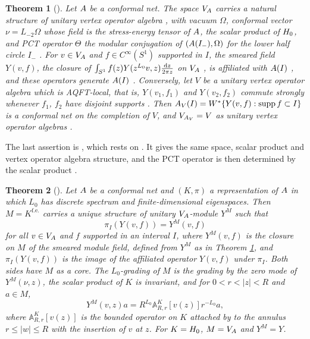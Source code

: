 \documentclass[leqno]{article}
\let\cal\relax
\newcommand{\cal}{\mathcal}
\renewcommand{\leq}{\ensuremath{\leqslant}}
\let\i\relax
\newcommand{\i}{\mathrm{i}}
\renewcommand{\d}{\mathop{}\mathopen{}\mathrm{d}}
\renewcommand{\d}{\mathop{}\mathopen{}\mathrm{d}}
\newtheorem{thm}{Theorem}[section]
\numberwithin{equation}{section}
\begin{document}
\begin{thm}[{\cite{HeT25}}]
\label{thm:HT-AB}
Let $\cal A$ be a conformal net. The space $V_{\cal A}$ carries a natural structure of unitary vertex operator algebra \cite[Theorems A and B p.~3, Theorems 7.11 p.~59 and 7.13 p.~61]{HeT25}, with vacuum $\Omega$, conformal vector $\nu = L_{-2}\Omega$ whose field is the stress-energy tensor of $\cal A$, the scalar product of $\cal H_0$, and PCT operator $\Theta$ the modular conjugation of $(\cal A(I_-),\Omega)$ for the lower half circle $I_-$ \cite[(34) p.~23]{HeT25}. For $v \in V_{\cal A}$ and $f \in C^\infty(S^1)$ supported in $I$, the smeared field $Y(v,f)$, the closure of $\int_{S^1} f(z)Y(z^{L_0}v,z)\frac{\d z}{2\pi\i z}$ on $V_{\cal A}$ \cite[Definition 8.2 p.~62]{HeT25}, is affiliated with $\cal A(I)$ \cite[Proposition 8.8 p.~65]{HeT25}, and these operators generate $\cal A(I)$ \cite[Theorem 8.9(i) p.~66]{HeT25}. Conversely, let $V$ be a unitary vertex operator algebra which is AQFT-local, that is, $Y(v_1,f_1)$ and $Y(v_2,f_2)$ commute strongly whenever $f_1$, $f_2$ have disjoint supports \cite[Definition 8.3 p.~62]{HeT25}. Then $\cal A_V(I) = W^*\{Y(v,f) : \operatorname{supp} f \subset I\}$ is a conformal net on the completion of $V$, and $V_{\cal A_V} = V$ as unitary vertex operator algebras \cite[Theorem 8.9 p.~66]{HeT25}.
\end{thm}

The last assertion is \cite[Theorem 8.9(ii)]{HeT25}, which rests on \cite[Proposition 4.6 p.~27]{RTT22}. It gives the same space, scalar product and vertex operator algebra structure, and the PCT operator is then determined by the scalar product \cite[Proposition 5.1 p.~33]{CKLW18}.

\begin{thm}[{\cite{HeT25}}]
\label{thm:HT-C}
Let $\cal A$ be a conformal net and $(K,\pi)$ a representation of $\cal A$ in which $L_0$ has discrete spectrum and finite-dimensional eigenspaces. Then $M = K^{\mathrm{f.e.}}$ carries a unique structure of unitary $V_{\cal A}$-module $Y^M$ \cite[Theorem C p.~5, Proposition 9.3 p.~68, Theorem 9.5 p.~70, Corollaries 9.6 and 9.7 p.~72]{HeT25} such that
\begin{equation}
\label{eq:HT-119}
\pi_I(Y(v,f)) = Y^M(v,f)
\end{equation}
for all $v \in V_{\cal A}$ and $f$ supported in an interval $I$, where $Y^M(v,f)$ is the closure on $M$ of the smeared module field, defined from $Y^M$ as in Theorem \ref{thm:HT-AB}, and $\pi_I(Y(v,f))$ is the image of the affiliated operator $Y(v,f)$ under $\pi_I$. Both sides have $M$ as a core. The $L_0$-grading of $M$ is the grading by the zero mode of $Y^M(\nu,z)$, the scalar product of $K$ is invariant, and for $0 < r < |z| < R$ and $a \in M$,
\begin{equation}
\label{eq:HT-115}
Y^M(v,z)a = R^{L_0}\mathbb A^K_{R,r}[v(z)]r^{-L_0}a,
\end{equation}
where $\mathbb A^K_{R,r}[v(z)]$ is the bounded operator on $K$ attached by \cite[(73) p.~43]{HeT25} to the annulus $r \leq |w| \leq R$ with the insertion of $v$ at $z$. For $K = \cal H_0$, $M = V_{\cal A}$ and $Y^M = Y$.
\end{thm}
\end{document}

